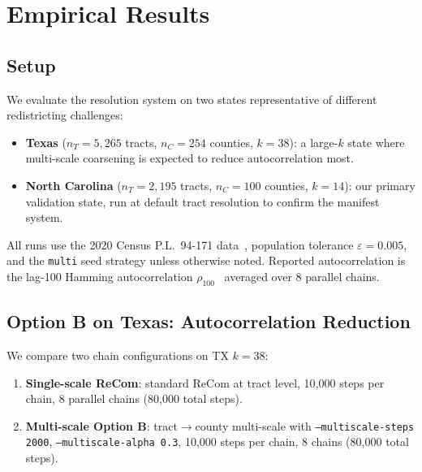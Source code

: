 \section{Empirical Results}
\label{sec:empirical}

\subsection{Setup}

We evaluate the resolution system on two states representative of different
redistricting challenges:
\begin{itemize}
  \item \textbf{Texas} ($n_T = 5{,}265$ tracts, $n_C = 254$ counties, $k=38$):
        a large-$k$ state where multi-scale coarsening is expected to reduce
        autocorrelation most.
  \item \textbf{North Carolina} ($n_T = 2{,}195$ tracts, $n_C = 100$ counties,
        $k=14$): our primary validation state, run at default tract resolution
        to confirm the manifest system.
\end{itemize}

All runs use the 2020 Census P.L.\ 94-171 data~\citep{census2020},
population tolerance $\varepsilon = 0.005$, and the \texttt{multi}
seed strategy unless otherwise noted.
Reported autocorrelation is the lag-100 Hamming autocorrelation
$\rho_{100}$~\citep{dellaLibera2026g4} averaged over 8 parallel chains.

\subsection{Option B on Texas: Autocorrelation Reduction}

We compare two chain configurations on TX $k=38$:
\begin{enumerate}
  \item \textbf{Single-scale ReCom}: standard ReCom at tract level,
        10{,}000 steps per chain, 8 parallel chains (80{,}000 total steps).
  \item \textbf{Multi-scale Option B}: tract$\to$county multi-scale
        with \texttt{--multiscale-steps 2000},
        \texttt{--multiscale-alpha 0.3}, 10{,}000 steps per chain,
        8 chains (80{,}000 total steps).
\end{enumerate}

